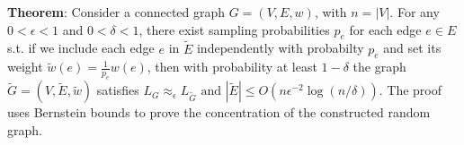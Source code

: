 \textbf{Theorem}: Consider a connected graph $G=(V, E, w)$, with $n=|V|$. For any $0<\epsilon<1$ and $0<\delta<1$, there exist sampling probabilities $p_{e}$ for each edge $e \in E$ s.t. if we include each edge $e$ in $\tilde{E}$ independently with probabilty $p_{e}$ and set its weight $\tilde{w}(e)=\frac{1}{p_{e}} w(e)$, then with probability at least $1-\delta$ the graph $\tilde{G}=(V, \tilde{E}, \tilde{w})$ satisfies
$
L_{G} \approx_{\epsilon} L_{\tilde{G}} \text { and }|\tilde{E}| \leq O\left(n \epsilon^{-2} \log (n / \delta)\right)
$.
The proof uses Bernstein bounds to prove the concentration of the constructed random graph.